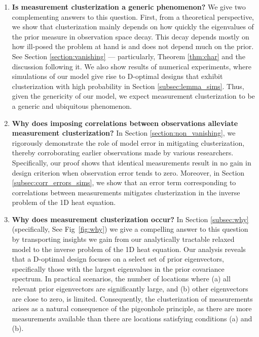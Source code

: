 \documentclass[ba]{imsart}
\theoremstyle{plain}
\theoremstyle{definition}
\theoremstyle{remark}
\begin{document}
\begin{enumerate}
\item \label{q:generic} \textbf{Is measurement clusterization a
  generic phenomenon?}
We give two complementing answers to this question. First, from a
  theoretical perspective, we show that clusterization mainly depends
  on how quickly the eigenvalues of the prior measure in observation
  space decay. This decay depends mostly on how ill-posed the problem
  at hand is and does not depend much on the prior. See Section
  \ref{section:vanishing} --- particularly, Theorem \ref{thm:char} and
  the discussion following it. We also show results of numerical
  experiments, where simulations of our model give rise to D-optimal
  designs that exhibit clusterization with high probability in Section
  \ref{subsec:lemma_sims}. Thus, given the genericity of our model, we
  expect measurement clusterization to be a generic and ubiquitous
  phenomenon.

\item \label{q:mitigate} \textbf{Why does imposing correlations
  between observations alleviate measurement clusterization?} In
  Section \ref{section:non_vanishing}, we rigorously demonstrate the
  role of model error in mitigating clusterization, thereby
  corroborating earlier observations made by various
  researchers. Specifically, our proof shows that identical
  measurements result in no gain in design criterion when observation
  error tends to zero. Moreover, in Section
  \ref{subsec:corr_errors_sims}, we show that an error term
  corresponding to correlations between measurements mitigates
  clusterization in the inverse problem of the 1D heat equation.

\item \label{q:why} \textbf{Why does measurement clusterization
  occur?} In Section \ref{subsec:why} (specifically, See
  Fig~\ref{fig:why}) we give a compelling answer to this question by
  transporting insights we gain from our analytically tractable
  relaxed model to the inverse problem of the 1D heat equation. Our
  analysis reveals that a D-optimal design focuses on a select set of
  prior eigenvectors, specifically those with the largest eigenvalues
  in the prior covariance spectrum. In practical scenarios, the number
  of locations where (a) all relevant prior eigenvectors are
  significantly large, and (b) other eigenvectors are close to zero,
  is limited. Consequently, the clusterization of measurements arises
  as a natural consequence of the pigeonhole principle, as there are
  more measurements available than there are locations satisfying
  conditions (a) and (b).









\end{enumerate}
\end{document}
